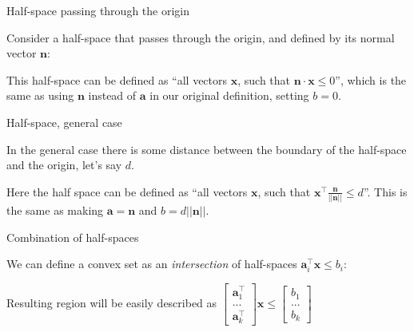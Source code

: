 \documentclass{beamer}
\begin{document}
\begin{frame}{Half-space passing through the origin}
\begin{flushleft}

Consider a half-space that passes through the origin, and defined by its normal vector $\mathbf{n}$:



This half-space can be defined as ``all vectors $\mathbf{x}$, such that $\mathbf{n} \cdot \mathbf{x} \leq 0$'', which is the same as using $\mathbf{n}$ instead of $\mathbf{a}$ in our original definition, setting $b = 0$.
 
\end{flushleft}
\end{frame}




\begin{frame}{Half-space, general case}
\begin{flushleft}

In the general case there is some distance between the boundary of the half-space and the origin, let's say $d$.


%
Here the half space can be defined as ``all vectors $\mathbf{x}$, such that $\mathbf{x}^\top \frac{\mathbf{n}}{|| \mathbf{n} ||}  \leq d$''. This is the same as making $\mathbf{a} = \mathbf{n}$ and $b = d ||\mathbf{n}||$.
 
\end{flushleft}
\end{frame}



\begin{frame}{Combination of half-spaces}
\begin{flushleft}

We can define a convex set as an \emph{intersection} of half-spaces $\mathbf{a}_i^\top \mathbf{x} \leq b_i$:



Resulting region will be easily described as $\begin{bmatrix} \mathbf{a}_1^\top \\ ... \\ \mathbf{a}_k^\top \end{bmatrix} \mathbf{x} \leq \begin{bmatrix} b_1 \\ ... \\ b_k \end{bmatrix}$

 
\end{flushleft}
\end{frame}
\end{document}
